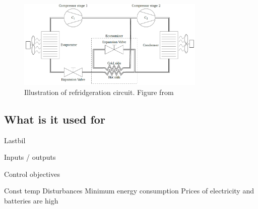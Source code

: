 \begin{figure}[h!]
	\centering
	\includegraphics[width=0.8\textwidth]{Graphics/HVAC_Diagram_Fans.png}
	\caption{Illustration of refridgeration circuit. Figure from \cite{Borlum2016}}
	\label{fig:HVAC_Diagram}
\end{figure}






\subsection{What is it used for}
	Lastbil
	
	
Inputs / outputs

Control objectives

	Const temp
		Disturbances
	Minimum energy consumption
		Prices of electricity and batteries are high
		
